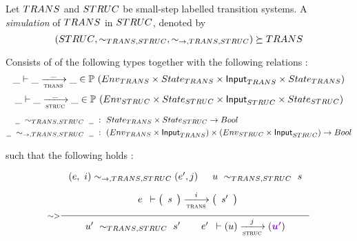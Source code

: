 Let $\TRANS$ and $\STRUC$ be small-step labelled transition systems.
A \emph{simulation} of $\TRANS$ in $\STRUC$, denoted by
\[ (\STRUC, \sim_{\TRANS,\STRUC}, \sim_{\to,\TRANS,\STRUC}) \succeq \TRANS \]

Consists of of the following types together with the following relations :
\begin{equation*}
  \_ \vdash
  \var{\_} \trans{trans}{\_} \var{\_}
  \in \powerset (\Env_{\TRANS} \times \State_{\TRANS} \times \Input_{\TRANS} \times \State_{\TRANS})
\end{equation*}
\begin{equation*}
  \_ \vdash
  \var{\_} \trans{struc}{\_} \var{\_}
  \in \powerset (\Env_{\STRUC} \times \State_{\STRUC} \times \Input_{\STRUC} \times \State_{\STRUC})
\end{equation*}
\begin{align*}
  \wcard~\sim_{\TRANS,\STRUC}~\wcard ~&:~ \State_{\TRANS} \times \State_{\STRUC} \to \Bool \\
  \wcard~\sim_{\to,\TRANS,\STRUC} ~\wcard ~&:~ (\Env_{\TRANS} \times \Input_{\TRANS}) \times (\Env_{\STRUC} \times \Input_{\STRUC}) \to \Bool
\end{align*}

such that the following holds :
  \begin{equation}
    \inference[$\sim >$]
    {
      \\~\\
      (e,~i) \sim_{\to,\TRANS,\STRUC} (e', j) & u~\sim_{\TRANS,\STRUC}~s
      \\~\\
      {
        \begin{array}{c}
          e\\
        \end{array}
      }
      \vdash
      {
        \left(
          \begin{array}{r}
            \var{s} \\
          \end{array}
        \right)
      }
      \trans{trans}{\var{i}}
      {
        \left(
          \begin{array}{r}
            \var{s'} \\
          \end{array}
        \right)
      }
      \\~\\
    }
    {
      u'~\sim_{\TRANS,\STRUC}~s' ~~~~~
      \begin{array}{r}
        e'\\
      \end{array}
    \vdash
      (u)
      \trans{struc}{j}
      (\varUpdate{u'})
    }
  \end{equation}

